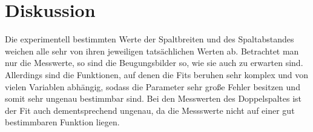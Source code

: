 \section{Diskussion}
\label{sec:Diskussion}

Die experimentell bestimmten Werte der Spaltbreiten und des Spaltabstandes
weichen alle sehr von ihren jeweiligen tatsächlichen Werten ab.
Betrachtet man nur die Messwerte, so sind die Beugungsbilder so,
wie sie auch zu erwarten sind. Allerdings sind die Funktionen,
auf denen die Fits beruhen sehr komplex und von vielen Variablen abhängig,
sodass die Parameter sehr große Fehler besitzen und somit sehr ungenau bestimmbar
sind. Bei den Messwerten des Doppelspaltes ist der Fit auch dementsprechend
ungenau, da die Messswerte nicht auf einer gut bestimmbaren Funktion liegen.
